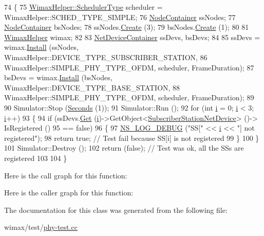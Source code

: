 \begin{DoxyCode}
74 \{
75   \hyperlink{classns3_1_1WimaxHelper_a27a40a8f601900126156781c2ca79406}{WimaxHelper::SchedulerType} scheduler = WimaxHelper::SCHED\_TYPE\_SIMPLE;
76   \hyperlink{classns3_1_1NodeContainer}{NodeContainer} ssNodes;
77   \hyperlink{classns3_1_1NodeContainer}{NodeContainer} bsNodes;
78   ssNodes.\hyperlink{classns3_1_1NodeContainer_a787f059e2813e8b951cc6914d11dfe69}{Create} (3);
79   bsNodes.\hyperlink{classns3_1_1NodeContainer_a787f059e2813e8b951cc6914d11dfe69}{Create} (1);
80 
81   \hyperlink{classns3_1_1WimaxHelper}{WimaxHelper} wimax;
82 
83   \hyperlink{classns3_1_1NetDeviceContainer}{NetDeviceContainer} ssDevs, bsDevs;
84 
85   ssDevs = wimax.\hyperlink{classns3_1_1WimaxHelper_a9f0848e09c4b6db9cdde9872b38f6349}{Install} (ssNodes, WimaxHelper::DEVICE\_TYPE\_SUBSCRIBER\_STATION,
86                           WimaxHelper::SIMPLE\_PHY\_TYPE\_OFDM, scheduler, FrameDuration);
87   bsDevs = wimax.\hyperlink{classns3_1_1WimaxHelper_a9f0848e09c4b6db9cdde9872b38f6349}{Install} (bsNodes, WimaxHelper::DEVICE\_TYPE\_BASE\_STATION,
88                           WimaxHelper::SIMPLE\_PHY\_TYPE\_OFDM, scheduler, FrameDuration);
89 
90   Simulator::Stop (\hyperlink{group__timecivil_ga33c34b816f8ff6628e33d5c8e9713b9e}{Seconds} (1));
91   Simulator::Run ();
92   \textcolor{keywordflow}{for} (\textcolor{keywordtype}{int} \hyperlink{bernuolliDistribution_8m_a6f6ccfcf58b31cb6412107d9d5281426}{i} = 0; \hyperlink{bernuolliDistribution_8m_a6f6ccfcf58b31cb6412107d9d5281426}{i} < 3; \hyperlink{bernuolliDistribution_8m_a6f6ccfcf58b31cb6412107d9d5281426}{i}++)
93     \{
94       \textcolor{keywordflow}{if} (ssDevs.\hyperlink{classns3_1_1NetDeviceContainer_a677d62594b5c9d2dea155cc5045f4d0b}{Get} (\hyperlink{bernuolliDistribution_8m_a6f6ccfcf58b31cb6412107d9d5281426}{i})->GetObject<\hyperlink{classns3_1_1SubscriberStationNetDevice}{SubscriberStationNetDevice}> ()->
      IsRegistered ()
95           == \textcolor{keyword}{false})
96         \{
97           \hyperlink{group__logging_ga413f1886406d49f59a6a0a89b77b4d0a}{NS\_LOG\_DEBUG} (\textcolor{stringliteral}{"SS["} << \hyperlink{bernuolliDistribution_8m_a6f6ccfcf58b31cb6412107d9d5281426}{i} << \textcolor{stringliteral}{"] not registered"});
98           \textcolor{keywordflow}{return} \textcolor{keyword}{true}; \textcolor{comment}{// Test fail because SS[i] is not registered}
99         \}
100     \}
101   Simulator::Destroy ();
102   \textcolor{keywordflow}{return} (\textcolor{keyword}{false}); \textcolor{comment}{// Test was ok, all the SSs are registered}
103 
104 \}
\end{DoxyCode}


Here is the call graph for this function\+:




Here is the caller graph for this function\+:




The documentation for this class was generated from the following file\+:\begin{DoxyCompactItemize}
\item 
wimax/test/\hyperlink{phy-test_8cc}{phy-\/test.\+cc}\end{DoxyCompactItemize}
